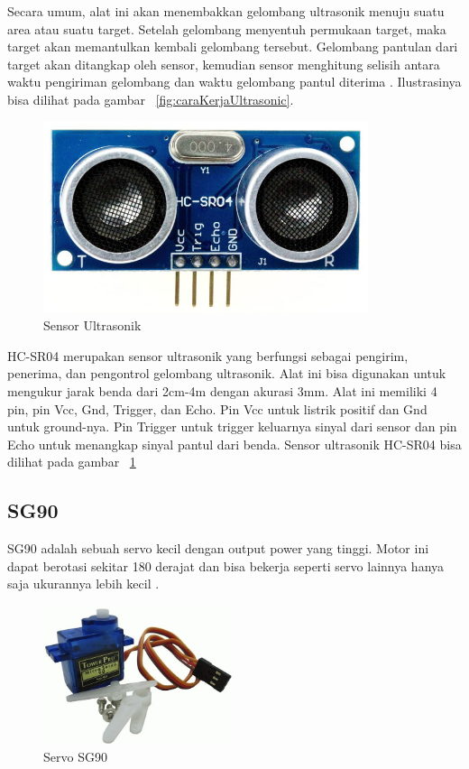 Secara umum, alat ini akan menembakkan gelombang ultrasonik menuju suatu area atau suatu target. Setelah gelombang menyentuh permukaan target, maka target akan memantulkan kembali gelombang tersebut. Gelombang pantulan dari target akan ditangkap oleh sensor, kemudian sensor menghitung selisih antara waktu pengiriman gelombang dan waktu gelombang pantul diterima . Ilustrasinya bisa dilihat pada gambar ~\ref{fig:caraKerjaUltrasonic}.

\begin{figure} [H]
    \includegraphics[width=0.85\textwidth, center]{images/ultrasonik.jpg}
    \caption{Sensor Ultrasonik}
    \label{fig:SensorUltrasonicHC-SR04}
\end{figure}

HC-SR04 merupakan sensor ultrasonik yang berfungsi sebagai pengirim, penerima, dan pengontrol gelombang ultrasonik. Alat ini bisa digunakan untuk mengukur jarak benda dari 2cm-4m dengan akurasi 3mm. Alat ini memiliki 4 pin, pin Vcc, Gnd, Trigger, dan Echo. Pin Vcc untuk listrik positif dan Gnd untuk ground-nya. Pin Trigger untuk trigger keluarnya sinyal dari sensor dan pin Echo untuk menangkap sinyal pantul dari benda. Sensor ultrasonik HC-SR04 bisa dilihat pada gambar ~\ref{fig:SensorUltrasonicHC-SR04}

\subsection{SG90}
SG90 adalah sebuah servo kecil dengan output power yang tinggi. Motor ini dapat berotasi sekitar 180 derajat dan bisa bekerja seperti servo lainnya hanya saja ukurannya lebih kecil .

\begin{figure} [H]
    \includegraphics[width=0.50\textwidth, center]{images/servo.jpg}
    \caption{Servo SG90}
    \label{fig:servo}
\end{figure}

